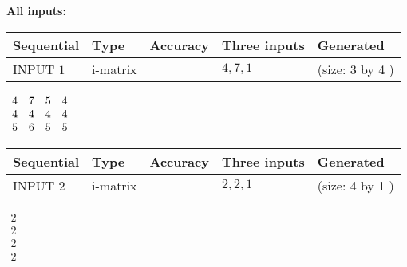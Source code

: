 \documentclass[12pt]{article}
\begin{document}
   
\noindent\vspace{0.1in}\hspace{-0.08in} {\textbf{\Large{All inputs: }}}
   
   
  
  
\noindent\begin{tabular}{|l|l|l|l|l|}
\hline
 Sequential & Type & Accuracy & Three inputs & Generated \\ 
\hline
 
 
  INPUT $            1 $ & i-matrix &  & $
 4
 , 
 7
 , 
 1
 $ & (size:            3  by            4 )
 \\  \hline  
 \end{tabular}
   
   
 $\begin{array}{
 c
 c
 c
 c
 }
           4  & 
           7  & 
           5  & 
           4  \\ 
           4  & 
           4  & 
           4  & 
           4  \\ 
           5  & 
           6  & 
           5  & 
           5
\end{array}  $ 
  
  
\noindent\begin{tabular}{|l|l|l|l|l|}
\hline
 Sequential & Type & Accuracy & Three inputs & Generated \\ 
\hline
 
 
  INPUT $            2 $ & i-matrix &  & $
 2
 , 
 2
 , 
 1
 $ & (size:            4  by            1 )
 \\  \hline  
 \end{tabular}
   
   
 $\begin{array}{
 c
 }
           2  \\ 
           2  \\ 
           2  \\ 
           2
\end{array}  $ 
  
\end{document}
